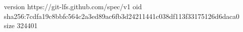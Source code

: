 version https://git-lfs.github.com/spec/v1
oid sha256:7cdfa19c8bbfc564c2a3ed89ac6fb3d24211441c038df113f33175126d6daca0
size 324401
